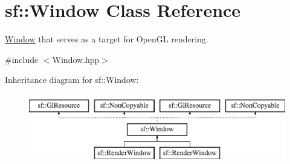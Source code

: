\hypertarget{classsf_1_1_window}{\section{sf\-:\-:Window Class Reference}
\label{classsf_1_1_window}
}


\hyperlink{classsf_1_1_window}{Window} that serves as a target for Open\-G\-L rendering.  




{\ttfamily \#include $<$Window.\-hpp$>$}

Inheritance diagram for sf\-:\-:Window\-:\begin{figure}[H]
\begin{center}
\leavevmode
\includegraphics[height=3.000000cm]{classsf_1_1_window}
\end{center}
\end{figure}
